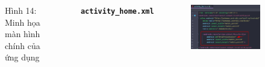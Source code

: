 \documentclass{beamer}
\begin{document}
\begin{frame}
\begin{columns}
\begin{figure}
            \caption{\centering\tiny{Hình 14: Minh họa màn hình chính của ứng dụng}}
        \end{figure}
        \indent \textbf{\texttt{activity\_home.xml}}
        \begin{figure}
            \centering
            \includegraphics[width=\textwidth]{images/14.png}
        \end{figure}
    \end{columns}
\end{frame}
\end{document}
